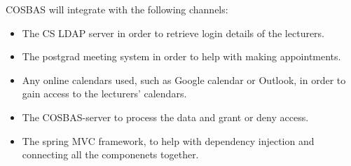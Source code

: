 COSBAS will integrate with the following channels:

\begin{itemize}
	\item The CS LDAP server in order to retrieve login details of the lecturers.
	\item The postgrad meeting system in order to help with making appointments.
	\item Any online calendars used, such as Google calendar or Outlook, in order to gain access to the lecturers' calendars.
	\item The COSBAS-server to process the data and grant or deny access.
	\item The spring MVC framework, to help with dependency injection and connecting all the componenets together.
\end{itemize}
